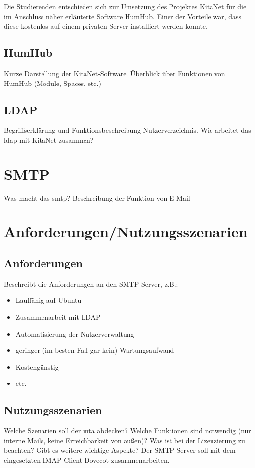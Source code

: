 Die Studierenden entschieden sich zur Umsetzung des Projektes KitaNet für die im Anschluss näher erläuterte Software HumHub.
Einer der Vorteile war, dass diese kostenlos auf einem privaten Server installiert werden konnte. 


\section{HumHub}
Kurze Darstellung der KitaNet-Software. Überblick über Funktionen von HumHub (Module, Spaces, etc.)

\section{LDAP}
Begriffserklärung und Funktionsbeschreibung Nutzerverzeichnis. 
Wie arbeitet das \ac{ldap} mit KitaNet zusammen?


\chapter{SMTP}
Was macht das \ac{smtp}? Beschreibung der Funktion von E-Mail

\chapter{Anforderungen/Nutzungsszenarien}
\section{Anforderungen}
Beschreibt die Anforderungen an den SMTP-Server, z.B.:
\begin{itemize}
	\item Lauffähig auf Ubuntu
	\item Zusammenarbeit mit LDAP
	\item Automatisierung der Nutzerverwaltung
	\item geringer (im besten Fall gar kein) Wartungsaufwand
	\item Kostengünstig
	\item etc.
\end{itemize}


\section{Nutzungsszenarien}
Welche Szenarien soll der \ac{mta} abdecken? Welche Funktionen sind notwendig (\zb nur interne Mails, keine Erreichbarkeit von außen)? Was ist bei der Lizenzierung zu beachten? Gibt es weitere wichtige Aspekte? Der SMTP-Server soll mit dem eingesetzten IMAP-Client Dovecot zusammenarbeiten.
